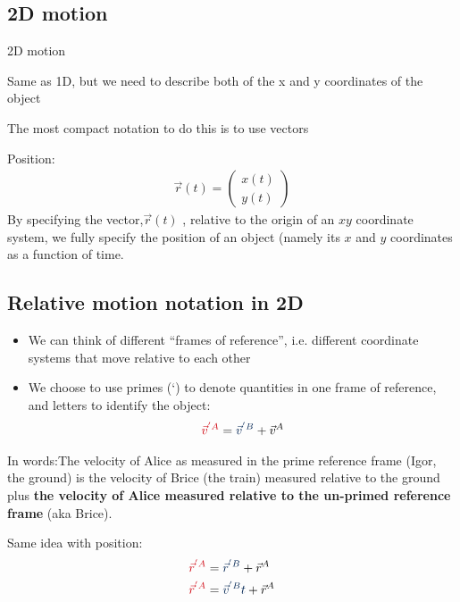\documentclass[aspectratio=169,
hyperref={colorlinks,urlcolor=blue}
]{beamer}
\begin{document}
\subsection{2D motion}
\label{subsec:2dmotion}
\begin{bulletframe}{2D motion}
\item Same as 1D, but we need to describe both of the x and y coordinates of the object
\item The most compact notation to do this is to use vectors
\item Position:
\begin{align*}
\vec r (t) = \begin{pmatrix}
x(t)\\y(t)
\end{pmatrix}
\end{align*}
By specifying the vector,$\vec r (t)$ , relative to the origin of an $xy$ coordinate system, we fully specify the position of an object (namely its $x$ and $y$ coordinates as a function of time.
\end{bulletframe}



\subsection{Relative motion notation in 2D}
\label{subsec:relmotionnotation2d}
{
\begin{itemize}
\item We can think of different ``frames of reference'', i.e. different coordinate systems that move relative to each other
\item We choose to use primes (‘) to denote quantities in one frame of reference, and letters to identify the object:
\begin{align*}
\textcolor{myred}{\vec v^{'A}}=\textcolor{myblue}{\vec v^{'B}}+\vec v^A
\end{align*}
\end{itemize}


In words:\textcolor{myred}{The velocity of Alice as measured in the prime reference frame (Igor, the ground)} \textcolor{myblue}{is the velocity of Brice (the train) measured relative to the ground} plus \textbf{the velocity of Alice measured relative to the un-primed reference frame} (aka Brice).
}
{
Same idea with position:
\begin{align*}
\textcolor{myred}{\vec r^{'A}}&=\textcolor{myblue}{\vec r^{'B}}+\vec r^A\\
\textcolor{myred}{\vec r^{'A}}&=\textcolor{myblue}{\vec v^{'B}t}+\vec r^A
\end{align*}
}
\end{document}
